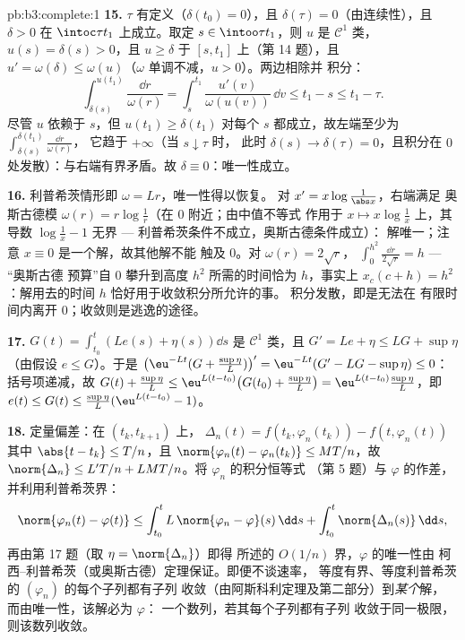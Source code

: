 \begin{solution}{pb:b3:complete:1}
\textbf{15.} $\tau$ 有定义（$\delta(t_0) = 0$），且
$\delta(\tau) = 0$（由连续性），且 $\delta > 0$ 在
$\intoc\tau{t_1}$ 上成立。取定 $s \in \intoo\tau{t_1}$，则 $u$
是 $\mathcal C^1$ 类，$u(s) = \delta(s) > 0$，且 $u \geq \delta$ 于
$[s, t_1]$ 上（第 14 题），且 $u' = \omega(\delta) \leq
\omega(u)$（$\omega$ 单调不减，$u > 0$）。两边相除并
积分：
\[
\int_{\delta(s)}^{u(t_1)}\frac{\dd r}{\omega(r)}
= \int_s^{t_1}\frac{u'(v)}{\omega(u(v))}\,\dd v \leq t_1 - s
\leq t_1 - \tau .
\]
尽管 $u$ 依赖于 $s$，但 $u(t_1) \geq
\delta(t_1)$ 对每个 $s$ 都成立，故左端至少为
$\int_{\delta(s)}^{\delta(t_1)}\frac{\dd r}{\omega(r)}$，
它趋于 $+\infty$（当 $s \downarrow \tau$ 时，
此时 $\delta(s) \to \delta(\tau) = 0$，且积分在
$0$ 处发散）：与右端有界矛盾。故
$\delta \equiv 0$：唯一性成立。

\textbf{16.} 利普希茨情形即 $\omega = Lr$，唯一性得以恢复。
对 $x' = x\log\frac1{\abs x}$，右端满足
奥斯古德模 $\omega(r) = r\log\frac1r$（在 $0$ 附近；由中值不等式
作用于 $x \mapsto x\log\frac1x$ 上，其导数
$\log\frac1x - 1$ 无界 --- 利普希茨条件不成立，奥斯古德条件成立）：
解唯一；注意 $x \equiv 0$ 是一个解，故其他解不能
触及 $0$。对 $\omega(r) = 2\sqrt r$，
$\int_0^{h^2}\frac{\dd r}{2\sqrt r} = h$ --- “奥斯古德
预算”自 $0$ 攀升到高度 $h^2$ 所需的时间恰为
$h$，事实上 $x_c(c + h) = h^2$：解用去的时间
$h$ 恰好用于收敛积分所允许的事。
积分发散，即是无法在
有限时间内离开 $0$；收敛则是逃逸的途径。

\textbf{17.} $G(t) = \int_{t_0}^t(Le(s) + \eta(s))\dd s$ 是
$\mathcal C^1$ 类，且 $G' = Le + \eta \leq LG + \sup\eta$
（由假设 $e \leq G$）。于是 $\bigl(\eu^{-Lt}(G +
\tfrac{\sup\eta}L)\bigr)' = \eu^{-Lt}(G' - LG - \sup\eta)
\leq 0$：括号项递减，故 $G(t) + \frac{\sup\eta}L
\leq \eu^{L(t - t_0)}\bigl(G(t_0) + \frac{\sup\eta}L\bigr) =
\eu^{L(t-t_0)}\frac{\sup\eta}L$，即 $e(t) \leq G(t) \leq
\frac{\sup\eta}L(\eu^{L(t-t_0)} - 1)$。

\textbf{18.} 定量偏差：在 $(t_k, t_{k+1})$ 上，
$\Delta_n(t) = f(t_k, \varphi_n(t_k)) - f(t, \varphi_n(t))$
其中 $\abs{t - t_k} \leq T/n$，且 $\norm{\varphi_n(t) -
\varphi_n(t_k)} \leq MT/n$，故 $\norm{\Delta_n} \leq L'T/n +
LMT/n$。将 $\varphi_n$ 的积分恒等式
（第 5 题）与 $\varphi$ 的作差，并利用利普希茨界：
\[
\norm{\varphi_n(t) - \varphi(t)} \leq
\int_{t_0}^t L\,\norm{\varphi_n - \varphi}(s)\,\dd s +
\int_{t_0}^t\norm{\Delta_n(s)}\,\dd s,
\]
再由第 17 题（取 $\eta = \norm{\Delta_n}$）即得
所述的 $O(1/n)$ 界，$\varphi$ 的唯一性由
柯西--利普希茨（或奥斯古德）定理保证。即便不谈速率，
等度有界、等度利普希茨的 $(\varphi_n)$ 的每个子列都有子列
收敛（由阿斯科利定理及第二部分）到\emph{某个}解，
而由唯一性，该解必为 $\varphi$：
一个数列，若其每个子列都有子列
收敛于同一极限，则该数列收敛。


\end{solution}
